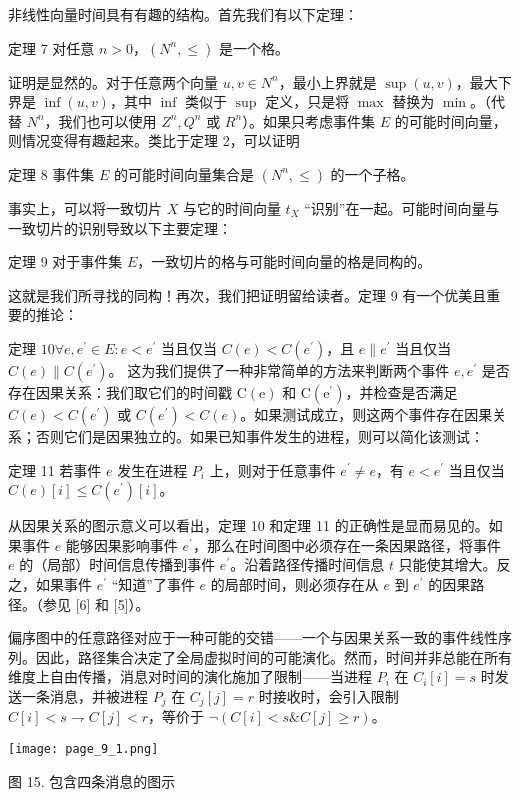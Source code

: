 \documentclass[12pt,a4paper]{report} %
\begin{document}
非线性向量时间具有有趣的结构。首先我们有以下定理：

定理 7 对任意 $n>0$，$(N^n, \leq)$ 是一个格。

证明是显然的。对于任意两个向量 $u, v \in N^n$，最小上界就是 $\sup(u, v)$，最大下界是 $\inf(u, v)$，其中 $\inf$ 类似于 $\sup$ 定义，只是将 $\max$ 替换为 $\min$。（代替 $N^n$，我们也可以使用 $Z^n, Q^n$ 或 $R^n$）。如果只考虑事件集 $E$ 的可能时间向量，则情况变得有趣起来。类比于定理 2，可以证明

定理 8 事件集 $E$ 的可能时间向量集合是 $(N^n, \leq)$ 的一个子格。

事实上，可以将一致切片 $X$ 与它的时间向量 $t_X$ “识别”在一起。可能时间向量与一致切片的识别导致以下主要定理：

定理 9 对于事件集 $E$，一致切片的格与可能时间向量的格是同构的。

这就是我们所寻找的同构！再次，我们把证明留给读者。定理 9 有一个优美且重要的推论：

定理 $10 \forall e, e^{\prime} \in E: e<e^{\prime}$ 当且仅当 $C(e)<C(e^{\prime})$，且 $e \| e^{\prime}$ 当且仅当 $C(e) \| C(e^{\prime})$。
这为我们提供了一种非常简单的方法来判断两个事件 $e, e^{\prime}$ 是否存在因果关系：我们取它们的时间戳 $\mathrm{C}(\mathrm{e})$ 和 $\mathrm{C}\left(\mathrm{e}^{\prime}\right)$，并检查是否满足 $C(e)<C\left(e^{\prime}\right)$ 或 $C\left(e^{\prime}\right)<C(e)$。如果测试成立，则这两个事件存在因果关系；否则它们是因果独立的。如果已知事件发生的进程，则可以简化该测试：

定理 11 若事件 $e$ 发生在进程 $P_{i}$ 上，则对于任意事件 $e^{\prime} \neq e$，有 $e<e^{\prime}$ 当且仅当 $C(e)[i] \leq C\left(e^{\prime}\right)[i]$。

从因果关系的图示意义可以看出，定理 10 和定理 11 的正确性是显而易见的。如果事件 $e$ 能够因果影响事件 $e^{\prime}$，那么在时间图中必须存在一条因果路径，将事件 $e$ 的（局部）时间信息传播到事件 $e^{\prime}$。沿着路径传播时间信息 $t$ 只能使其增大。反之，如果事件 $e^{\prime}$ “知道”了事件 $e$ 的局部时间，则必须存在从 $e$ 到 $e^{\prime}$ 的因果路径。（参见 [6] 和 [5]）。

偏序图中的任意路径对应于一种可能的交错——一个与因果关系一致的事件线性序列。因此，路径集合决定了全局虚拟时间的可能演化。然而，时间并非总能在所有维度上自由传播，消息对时间的演化施加了限制——当进程 $P_{i}$ 在 $C_{i}[i]=s$ 时发送一条消息，并被进程 $P_{j}$ 在 $C_{j}[j]=r$ 时接收时，会引入限制 $C[i]<s \rightharpoondown C[j]<r$，等价于 $\neg(C[i]<s \& C[j] \geq r)$。

\begin{center}
\texttt{[image: page\_9\_1.png]}
\end{center}
\begin{center}
图 15. 包含四条消息的图示
\end{center}
\end{document}
